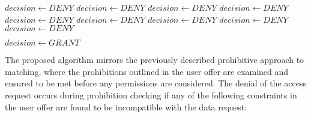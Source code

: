 \begin{algorithm}
\begin{algorithmic}
        $decision \gets DENY$
    \EndIf
            $decision \gets DENY$
        \EndIf
    \EndIf
            $decision \gets DENY$
        \EndIf
    \EndIf
                $decision \gets DENY$
            \EndIf
                $decision \gets DENY$
            \EndIf
                $decision \gets DENY$
            \EndIf
                $decision \gets DENY$
            \EndIf
                $decision \gets DENY$
            \EndIf
                $decision \gets DENY$
            \EndIf
        \EndIf 
    \EndFor 
\EndFor

    $decision \gets GRANT$
\EndIf
\end{algorithmic}
\end{algorithm}

The proposed algorithm mirrors the previously described prohibitive approach to matching, where the prohibitions outlined in the user offer are examined and ensured to be met before any permissions are considered.
The denial of the access request occurs during prohibition checking if any of the following constraints in the user offer are found to be incompatible with the data request:

